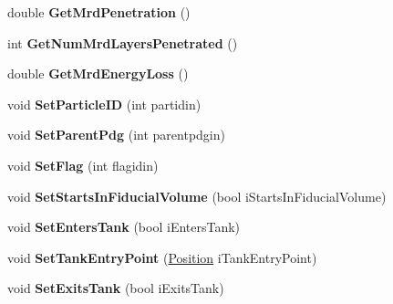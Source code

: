 \begin{DoxyCompactItemize}
\item 
\hypertarget{classMCParticle_a3d260af122ff90824de2e2be7f672f07}{double {\bfseries Get\-Mrd\-Penetration} ()}\label{classMCParticle_a3d260af122ff90824de2e2be7f672f07}

\item 
\hypertarget{classMCParticle_afa08a1cb74a4b0b642f0b62c04114976}{int {\bfseries Get\-Num\-Mrd\-Layers\-Penetrated} ()}\label{classMCParticle_afa08a1cb74a4b0b642f0b62c04114976}

\item 
\hypertarget{classMCParticle_ac8325eb8dd7e2d10b6b406dfcd6b31af}{double {\bfseries Get\-Mrd\-Energy\-Loss} ()}\label{classMCParticle_ac8325eb8dd7e2d10b6b406dfcd6b31af}

\item 
\hypertarget{classMCParticle_ab3f8776c846fcc1c82f2d9083beaf07f}{void {\bfseries Set\-Particle\-I\-D} (int partidin)}\label{classMCParticle_ab3f8776c846fcc1c82f2d9083beaf07f}

\item 
\hypertarget{classMCParticle_a835ce089d630c4624a3060980450ca2c}{void {\bfseries Set\-Parent\-Pdg} (int parentpdgin)}\label{classMCParticle_a835ce089d630c4624a3060980450ca2c}

\item 
\hypertarget{classMCParticle_ace8eaad4c1fd7398fb5bda3316b5395b}{void {\bfseries Set\-Flag} (int flagidin)}\label{classMCParticle_ace8eaad4c1fd7398fb5bda3316b5395b}

\item 
\hypertarget{classMCParticle_a2a42a4f6ef9af8a6158e422680a57b47}{void {\bfseries Set\-Starts\-In\-Fiducial\-Volume} (bool i\-Starts\-In\-Fiducial\-Volume)}\label{classMCParticle_a2a42a4f6ef9af8a6158e422680a57b47}

\item 
\hypertarget{classMCParticle_a1fb1b9c4206de10c602b1095e6428578}{void {\bfseries Set\-Enters\-Tank} (bool i\-Enters\-Tank)}\label{classMCParticle_a1fb1b9c4206de10c602b1095e6428578}

\item 
\hypertarget{classMCParticle_a2cfded14729766192df1b9770edba92a}{void {\bfseries Set\-Tank\-Entry\-Point} (\hyperlink{classPosition}{Position} i\-Tank\-Entry\-Point)}\label{classMCParticle_a2cfded14729766192df1b9770edba92a}

\item 
\hypertarget{classMCParticle_a702069712afdc032362de66c133c0165}{void {\bfseries Set\-Exits\-Tank} (bool i\-Exits\-Tank)}\label{classMCParticle_a702069712afdc032362de66c133c0165}


\end{DoxyCompactItemize}
